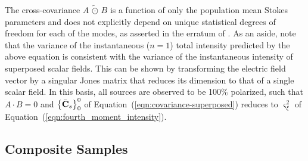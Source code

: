 \documentclass[twocolumn]{aastex6}
\newcommand{\Eqn}[1]{Equation~(\ref{eqn:#1})}
\newcommand{\outerSymm}[2]{\ensuremath{{#1}\,\tilde{\odot}\,{#2}}}
\newcommand{\instI}{\ensuremath{\xi}}
\begin{document}
The cross-covariance $\outerSymm{A}{B}$ is a function of only the population
mean Stokes parameters and does not explicitly depend on unique
statistical degrees of freedom for each of the modes, as asserted in
the erratum of \cite{van09}.
%
As an aside, note that the variance of the instantaneous ($n=1$) total
intensity predicted by the above equation is consistent with the variance
of the instantaneous intensity of superposed scalar fields.
%
This can be shown by transforming the electric field vector by a
singular Jones matrix that reduces its dimension to that of a single
scalar field.
%
In this basis, all sources are observed to be 100\% polarized, such
that $A \cdot B = 0$ and $\left\{\bar{\bf C}_s\right\}_0^0$ of
\Eqn{covariance-superposed} reduces to $\varsigma_\instI^2$ of
\Eqn{fourth_moment_intensity}.



\subsection{Composite Samples}
\label{sec:composite}
\end{document}
